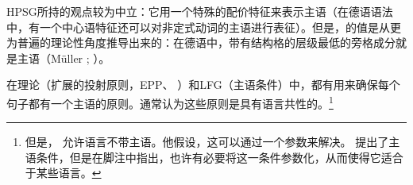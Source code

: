 HPSG\indexhpsgc 所持的观点较为中立：它用一个特殊的配价特征来表示主语（在德语语法中，有一个中心语特征还可以对非定式动词的主语进行表征）。但是，\subjfc 的值是从更为普遍的理论性角度推导出来的：在德语中，带有结构格的层级最低的旁格成分就是主语（Müller \citeyear[]{Mueller2002b}; \citeyear[]{MuellerLehrbuch1}）。

在\gbc 理论（扩展的投射原则，EPP、 ）和LFG\indexlfg （主语条件）中，都有用来确保每个句子都有一个主语的原则。通常认为这些原则是具有语言共性的。\footnote{%
但是，  \citet[]{Chomsky81a}允许语言不带主语。他假设，这可以通过一个参数来解决。 \citet[]{Bresnan2001a}提出了主语条件，但是在脚注中指出，也许有必要将这一条件参数化，从而使得它适合于某些语言。%
} 
 
